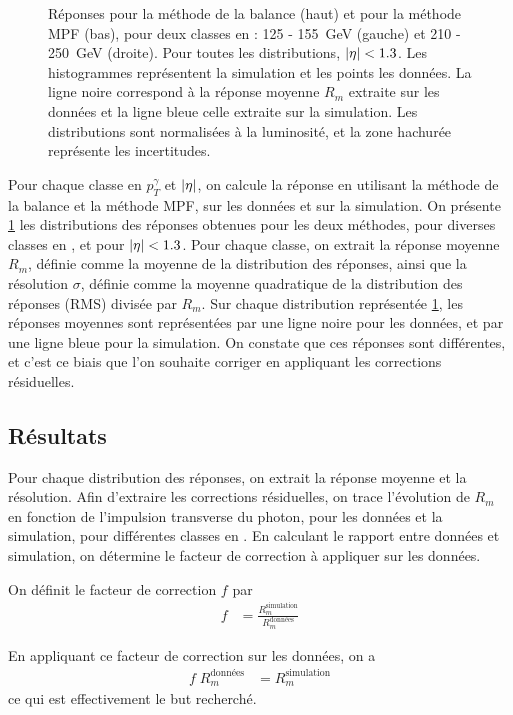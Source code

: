 \begin{figure}[p]
    \caption{Réponses pour la méthode de la balance (haut) et pour la méthode MPF (bas), pour deux classes en \pt : 125 - \SI{155}{\GeV} (gauche) et 210 - \SI{250}{\GeV} (droite). Pour toutes les distributions, $\lvert \eta \rvert < \num{1.3}$. Les histogrammes représentent la simulation et les points les données. La ligne noire correspond à la réponse moyenne $R_m$ extraite sur les données et la ligne bleue celle extraite sur la simulation. Les distributions sont normalisées à la luminosité, et la zone hachurée représente les incertitudes.}
    \label{fig:responses_mpf_balancing}
\end{figure}

Pour chaque classe en $p_T^{\gamma}$ et $\lvert \eta \rvert$, on calcule la réponse en utilisant la méthode de la balance et la méthode MPF, sur les données et sur la simulation. On présente \cref{fig:responses_mpf_balancing} les distributions des réponses obtenues pour les deux méthodes, pour diverses classes en \pt, et pour $\lvert \eta \rvert < \num{1.3}$. Pour chaque classe, on extrait la réponse moyenne $R_m$, définie comme la moyenne de la distribution des réponses, ainsi que la résolution $\sigma$, définie comme la moyenne quadratique de la distribution des réponses (RMS) divisée par $R_m$. Sur chaque distribution représentée \cref{fig:responses_mpf_balancing}, les réponses moyennes sont représentées par une ligne noire pour les données, et par une ligne bleue pour la simulation. On constate que ces réponses sont différentes, et c'est ce biais que l'on souhaite corriger en appliquant les corrections résiduelles.

\subsection{Résultats} \label{sec:jetmet_results}

Pour chaque distribution des réponses, on extrait la réponse moyenne et la résolution. Afin d'extraire les corrections résiduelles, on trace l'évolution de $R_m$ en fonction de l'impulsion transverse du photon, pour les données et la simulation, pour différentes classes en \aeta. En calculant le rapport entre données et simulation, on détermine le facteur de correction à appliquer sur les données.

On définit le facteur de correction $f$ par
\begin{align*}
  f &= \frac{R_m^{\text{simulation}}}{R_m^{\text{données}}}
\end{align*}

En appliquant ce facteur de correction sur les données, on a
\begin{align*}
  f\;R_m^{\text{données}} &= R_m^{\text{simulation}}
\end{align*}
ce qui est effectivement le but recherché.

